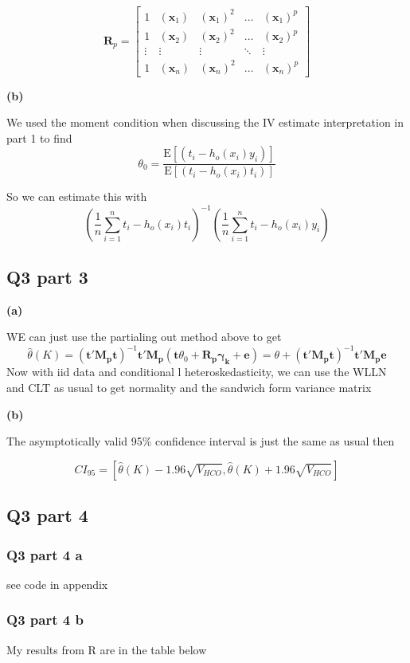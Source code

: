\documentclass[11pt]{article}
\newcommand{\E}{\mathrm{E}}
\begin{document}
$$
\bm{R}_p = 
\begin{bmatrix}
	1 & (\bm{x}_1) & (\bm{x}_1)^2 & \dots& (\bm{x}_1)^p \\
	1 & (\bm{x}_2) & (\bm{x}_2)^2 & \dots& (\bm{x}_2)^p\\
	\vdots & \vdots & \vdots & \ddots & \vdots \\
	1 & (\bm{x}_n) & (\bm{x}_n)^2 & \dots& (\bm{x}_n)^p
\end{bmatrix}
$$

\textbf{(b)}

We used the moment condition when discussing the IV estimate interpretation in part 1 to find
$$\theta_0= \frac{\E[(t_i - h_o(x_i)y_i )] }{\E[(t_i - h_o(x_i)t_i)]}$$

So we can estimate this with 
$$\left(\frac{1}{n} \sum_{i=1}^{n}t_i - h_o(x_i)t_i \right)^{-1}\left(\frac{1}{n} \sum_{i=1}^{n}t_i - h_o(x_i)y_i \right) $$

\subsection{Q3 part 3}
\textbf{(a)}

WE can just use the partialing out method above to get 
$$\hat{\theta}(K) = (\bm{t'M_pt})^{-1}\bm{t'M_p}(\bm{t} \theta_0 + \bm{R_p \gamma_k} + \bm{e}) = \theta + (\bm{t'M_pt})^{-1} \bm{t'M_pe}$$
Now with iid data and conditional l heteroskedasticity, we can use the WLLN and CLT as usual to get normality and the sandwich form variance matrix 

\textbf{(b)}

The asymptotically valid 95\% confidence interval is just the same as usual then

$$ CI_{95} = [\hat{\theta}(K) - 1.96\sqrt{V_{HCO}},\hat{\theta}(K) + 1.96\sqrt{V_{HCO}} ]
$$ 

\subsection{Q3 part 4}
\subsubsection{Q3 part 4 a}
see code in appendix 
\subsubsection{Q3 part 4 b}

My results from R are in the table below 

\begin{center}
	
\end{center}
\end{document}
